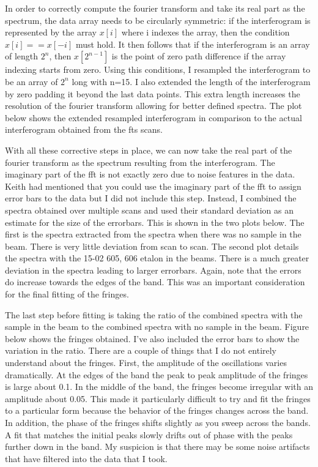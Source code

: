 \documentclass[12pt]{article}
\begin{document}
In order to correctly compute the fourier transform and take its real part as the spectrum, the data array needs to be circularly symmetric: if the interferogram is represented by the array $x[i]$ where i indexes the array, then the condition $x[i] == x[-i]$ must hold. It then follows that if the interferogram is an array of length $2^n$, then 
$x[2^{n-1}]$ is the point of zero path difference if the array indexing starts from zero. Using this conditions, I resampled the interferogram to be an array of $2^n$ long with n=15. I also extended the length of the interferogram by zero padding it beyond the last data points. This extra length increases the resolution of the fourier transform allowing for better defined spectra. The plot below shows the extended resampled interferogram in comparison to the actual interferogram obtained from the fts scans.

With all these corrective steps in place, we can now take the real part of the fourier transform as the spectrum resulting from the interferogram. The imaginary part of the fft is not exactly zero due to noise features in the data. Keith had mentioned that you could use the imaginary part of the fft to assign error bars to the data but I did not include this step. Instead, I combined the spectra obtained over multiple scans and used their standard deviation as an estimate for the size of the errorbars. This is shown in the two plots below. The first is the spectra extracted from the spectra when there was no sample in the beam. There is very little deviation from scan to scan. The second plot details the spectra with the 15-02 605, 606 etalon in the beams. There is a much greater deviation in the spectra leading to larger errorbars. Again, note that the errors do increase towards the edges of the band. This was an important consideration for the final fitting of the fringes.

The last step before fitting is taking the ratio of the combined spectra with the sample in the beam to the combined spectra with no sample in the beam. Figure below shows the fringes obtained. I've also included the error bars to show the variation in the ratio. There are a couple of things that I do not entirely understand about the fringes. First, the amplitude of the oscillations varies dramatically. At the edges of the band the peak to peak amplitude of the fringes is large about 0.1. In the middle of the band, the fringes become irregular with an amplitude about 0.05. This made it particularly difficult to try and fit the fringes to a particular form because the behavior of the fringes changes across the band. In addition, the phase of the fringes shifts slightly as you sweep across the bands. A fit that matches the initial peaks slowly drifts out of phase with the peaks further down in the band. My suspicion is that there may be some noise artifacts that have filtered into the data that I took.
\end{document}
